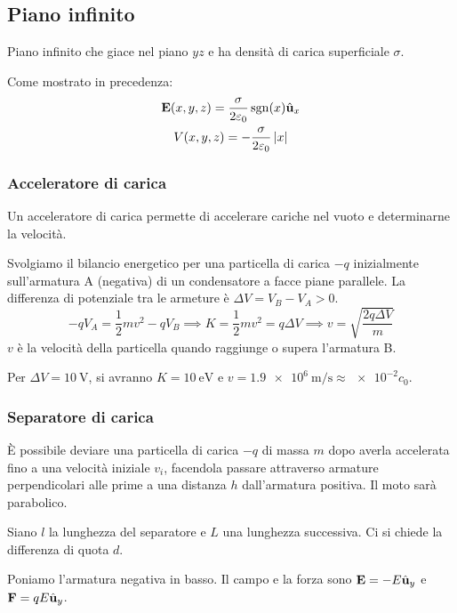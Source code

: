 \subsection{Piano infinito}

Piano infinito che giace nel piano $yz$ e ha densità di carica superficiale $\sigma$.

Come mostrato in precedenza:
\begin{gather}
    \mathbf{E}(x, y, z) = \frac{\sigma}{2\varepsilon_0} \operatorname{sgn}(x) \hat{\mathbf{u}}_{x} \\
    V(x, y, z) = -\frac{\sigma}{2\varepsilon_0} \left\lvert x \right\rvert
\end{gather}

\subsubsection{Acceleratore di carica}
\label{sec:acceleratore_carica}

Un acceleratore di carica permette di accelerare cariche nel vuoto e determinarne la velocità.

Svolgiamo il bilancio energetico per una particella di carica $-q$ inizialmente sull'armatura A (negativa) di un condensatore a facce piane parallele.
La differenza di potenziale tra le armeture è $\Delta V = V_B - V_A > 0$.
\begin{equation}
    -q V_A = \frac{1}{2} m v^2 - q V_B
    \implies K = \frac{1}{2} m v^2 = q \Delta V
    \implies v = \sqrt{\frac{2 q \Delta V}{m}}
\end{equation}
$v$ è la velocità della particella quando raggiunge o supera l'armatura B.

Per $\Delta V = \qty{10}{\volt}$, si avranno $K = \qty{10}{\electronvolt}$ e $v = \qty{1.9e6}{\metre\per\second} \approx \num{e-2} c_0$.

\subsubsection{Separatore di carica}

È possibile deviare una particella di carica $-q$ di massa $m$ dopo averla accelerata fino a una velocità iniziale $v_i$, facendola passare attraverso armature perpendicolari alle prime a una distanza $h$ dall'armatura positiva.
Il moto sarà parabolico.

Siano $l$ la lunghezza del separatore e $L$ una lunghezza successiva.
Ci si chiede la differenza di quota $d$.

Poniamo l'armatura negativa in basso.
Il campo e la forza sono $\mathbf{E} = -E \hat{\mathbf{u}}_{y}$ e $\mathbf{F} = q E \hat{\mathbf{u}}_{y}$.


